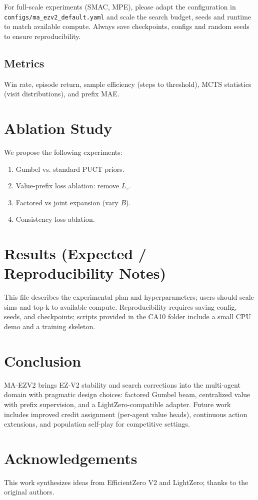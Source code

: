 \documentclass[10pt]{article}
\begin{document}
For full-scale experiments (SMAC, MPE), please adapt the configuration in \texttt{configs/ma_ezv2_default.yaml} and scale the search budget, seeds and runtime to match available compute. Always save checkpoints, configs and random seeds to ensure reproducibility.
\subsection{Metrics}
Win rate, episode return, sample efficiency (steps to threshold), MCTS statistics (visit distributions), and prefix MAE.

\section{Ablation Study}
We propose the following experiments:
\begin{enumerate}
  \item Gumbel vs. standard PUCT priors.
  \item Value-prefix loss ablation: remove $L_z$.
  \item Factored vs joint expansion (vary $B$).
  \item Consistency loss ablation.
\end{enumerate}

\section{Results (Expected / Reproducibility Notes)}
This file describes the experimental plan and hyperparameters; users should scale sims and top-k to available compute. Reproducibility requires saving config, seeds, and checkpoints; scripts provided in the CA10 folder include a small CPU demo and a training skeleton.

\section{Conclusion}
MA-EZV2 brings EZ-V2 stability and search corrections into the multi-agent domain with pragmatic design choices: factored Gumbel beam, centralized value with prefix supervision, and a LightZero-compatible adapter. Future work includes improved credit assignment (per-agent value heads), continuous action extensions, and population self-play for competitive settings.

\section*{Acknowledgements}
This work synthesizes ideas from EfficientZero V2 and LightZero; thanks to the original authors.
\end{document}
